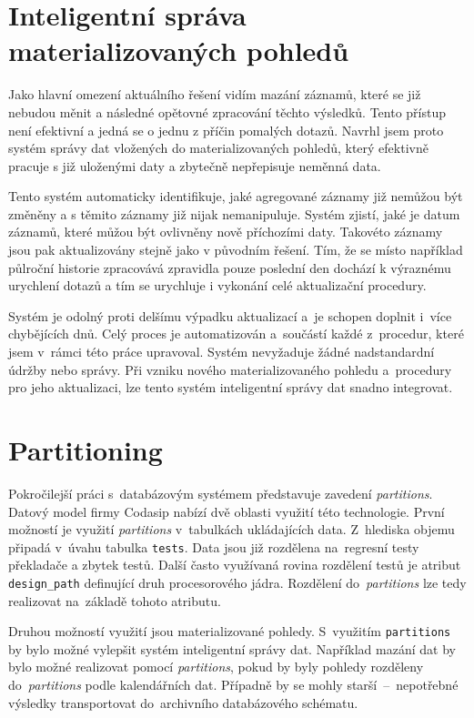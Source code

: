 \section{Inteligentní správa materializovaných pohledů}
\label{section:inteligentni_auto_sprava}
Jako hlavní omezení aktuálního řešení vidím mazání záznamů, které se již nebudou měnit a následné opětovné zpracování těchto výsledků. Tento přístup není efektivní a jedná se o jednu z příčin pomalých dotazů. Navrhl jsem proto systém správy dat vložených do materializovaných pohledů, který efektivně pracuje s již uloženými daty a zbytečně nepřepisuje neměnná data.

Tento systém automaticky identifikuje, jaké agregované záznamy již nemůžou být změněny a s těmito záznamy již nijak nemanipuluje. Systém zjistí, jaké je datum záznamů, které můžou být ovlivněny nově příchozími daty. Takovéto záznamy jsou pak aktualizovány stejně jako v původním řešení. Tím, že se místo například půlroční historie zpracovává zpravidla pouze poslední den dochází k výraznému urychlení dotazů a tím se urychluje i vykonání celé aktualizační procedury.

Systém je odolný proti delšímu výpadku aktualizací a~je schopen doplnit i~více chybějících dnů. Celý proces je automatizován a~součástí každé z~procedur, které jsem v~rámci této práce upravoval. Systém nevyžaduje žádné nadstandardní údržby nebo správy. Při vzniku nového materializovaného pohledu a~procedury pro jeho aktualizaci, lze tento systém inteligentní správy dat snadno integrovat.

\section{Partitioning}
\label{section:partitioning}
Pokročilejší práci s~databázovým systémem představuje zavedení \textit{partitions}. Datový model firmy Codasip nabízí
dvě oblasti využití této technologie. První možností je využití \mbox{\textit{partitions}} v~tabulkách ukládajících data.
Z~hlediska objemu připadá v~úvahu tabulka \texttt{tests}. Data jsou již rozdělena na~regresní testy překladače a
zbytek testů. Další často využívaná rovina rozdělení testů je atribut \texttt{design\_path} definující druh procesorového jádra. Rozdělení do~\textit{partitions} lze tedy realizovat na~základě tohoto atributu.

Druhou možností využití jsou materializované pohledy. S~využitím \texttt{partitions} by bylo možné vylepšit systém inteligentní správy dat. Například mazání dat by bylo možné realizovat pomocí \textit{partitions}, pokud by byly pohledy rozděleny do~\textit{partitions} podle kalendářních dat. Případně by se mohly starší~--~nepotřebné výsledky transportovat do~archivního databázového schématu.


